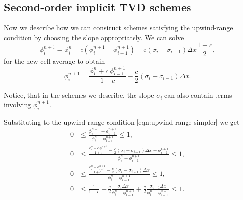 \documentclass[../thesis.tex]{subfiles}
\begin{document}
\subsection[]{Second-order implicit TVD schemes}
Now we describe how we can construct schemes satisfying the upwind-range condition by choosing the slope appropriately.
We can solve
\begin{equation}
    \phi_{i}^{n+1}
    = \phi_{i}^{n} - c\left(
        \phi_{i}^{n+1}
        - \phi_{i-1}^{n+1}
        \right)
        -c\left(
        \sigma_{i} - \sigma_{i-1}
        \right)\Delta x\frac{1+c}{2},
\end{equation}
for the new cell average to obtain
\begin{equation}\label{eqn: second order implicit - solution}
    \phi_{i}^{n+1} =
    \frac{\phi_{i}^{n} +
    c~\phi_{i-1}^{n+1}}{1+c}
    -\frac{c}{2}\left(
        \sigma_{i} - \sigma_{i-1}
        \right)\Delta x.
\end{equation}
\begin{remark}
    Notice, that in the schemes we describe, the slope \(\sigma_{i}\) can also contain terms involving \(\phi_{i}^{n+1}\).
\end{remark}
Substituting to the upwind-range condition \eqref{eqn:upwind-range-simpler} we get
\begin{equation}
    \begin{split}\label{eqn: urc-all c-necessary}
        0
        &\leq
        \frac{\phi_{i}^{n+1} - \phi_{i-1}^{n+1}}
        {\phi_{i}^{n} - \phi_{i-1}^{n+1}}
        \leq
        1,
        \\
        0
        &\leq
        \frac{
        \frac{\phi_{i}^{n} +
        c~\phi_{i-1}^{n+1}}{1+c}
        -\frac{c}{2}\left(
            \sigma_{i} - \sigma_{i-1}
            \right)\Delta x - \phi_{i-1}^{n+1}}{\phi_{i}^{n} - \phi_{i-1}^{n+1}}
        \leq
        1,
        \\
        0
        &\leq
        \frac{
        \frac{\phi_{i}^{n} - \phi_{i-1}^{n+1}}{1+c}
        -\frac{c}{2}\left(
            \sigma_{i} - \sigma_{i-1}
            \right)\Delta x}{\phi_{i}^{n} - \phi_{i-1}^{n+1}}
        \leq
        1,
        \\
        0
        &\leq
        \frac{1}{1+c}
        -\frac{c}{2}
        \frac{\sigma_{i}\Delta x}
        {\phi_{i}^{n} - \phi_{i-1}^{n+1}}
        +\frac{c}{2}
        \frac{\sigma_{i-1}\Delta x}
        {\phi_{i}^{n} - \phi_{i-1}^{n+1}}
        \leq
        1.
    \end{split}
\end{equation}
\end{document}
